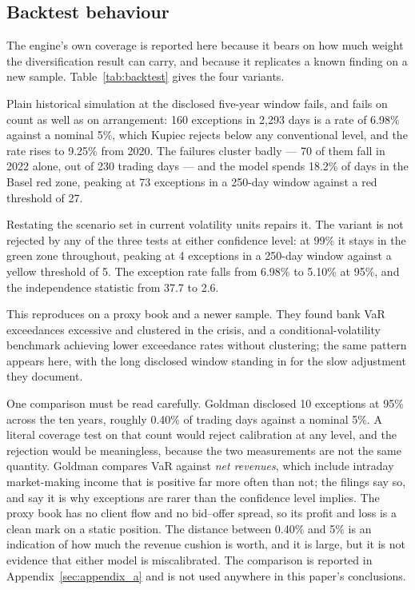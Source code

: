 \subsection{Backtest behaviour}

The engine's own coverage is reported here because it bears on how much weight
the diversification result can carry, and because it replicates a known finding
on a new sample. Table~\ref{tab:backtest} gives the four variants.



Plain historical simulation at the disclosed five-year window fails, and fails
on count as well as on arrangement: 160 exceptions in 2{,}293 days is a rate of
6.98\% against a nominal 5\%, which Kupiec rejects below any conventional
level, and the rate rises to 9.25\% from 2020. The failures cluster badly ---
70 of them fall in 2022 alone, out of 230 trading days --- and the model spends
18.2\% of days in the Basel red zone, peaking at 73 exceptions in a 250-day
window against a red threshold of 27.

Restating the scenario set in current volatility units repairs it. The
\citet{hullwhite1998} variant is not rejected by any of the three tests at
either confidence level: at 99\% it stays in the green zone throughout, peaking
at 4 exceptions in a 250-day window against a yellow threshold of 5. The
exception rate falls from 6.98\% to 5.10\% at 95\%, and the independence
statistic from 37.7 to 2.6.

This reproduces \citet{obrien2017evaluation} on a proxy book and a newer
sample. They found bank VaR exceedances excessive and clustered in the crisis,
and a conditional-volatility benchmark achieving lower exceedance rates without
clustering; the same pattern appears here, with the long disclosed window
standing in for the slow adjustment they document.

One comparison must be read carefully. Goldman disclosed 10 exceptions at 95\%
across the ten years, roughly 0.40\% of trading days against a nominal 5\%. A
literal coverage test on that count would reject calibration at any level, and
the rejection would be meaningless, because the two measurements are not the
same quantity. Goldman compares VaR against \emph{net revenues}, which include
intraday market-making income that is positive far more often than not; the
filings say so, and say it is why exceptions are rarer than the confidence
level implies. The proxy book has no client flow and no bid--offer spread, so
its profit and loss is a clean mark on a static position. The distance between
0.40\% and 5\% is an indication of how much the revenue cushion is worth, and
it is large, but it is not evidence that either model is miscalibrated. The
comparison is reported in Appendix~\ref{sec:appendix_a} and is not used
anywhere in this paper's conclusions.
